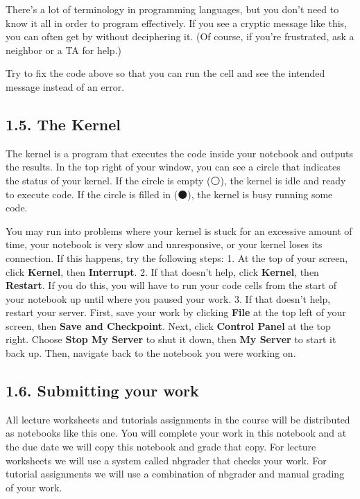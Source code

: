 \documentclass[11pt]{article}
\begin{document}
    There's a lot of terminology in programming languages, but you don't
need to know it all in order to program effectively. If you see a
cryptic message like this, you can often get by without deciphering it.
(Of course, if you're frustrated, ask a neighbor or a TA for help.)

Try to fix the code above so that you can run the cell and see the
intended message instead of an error.

    \subsection{1.5. The Kernel}\label{the-kernel}

The kernel is a program that executes the code inside your notebook and
outputs the results. In the top right of your window, you can see a
circle that indicates the status of your kernel. If the circle is empty
(⚪), the kernel is idle and ready to execute code. If the circle is
filled in (⚫), the kernel is busy running some code.

You may run into problems where your kernel is stuck for an excessive
amount of time, your notebook is very slow and unresponsive, or your
kernel loses its connection. If this happens, try the following steps:
1. At the top of your screen, click \textbf{Kernel}, then
\textbf{Interrupt}. 2. If that doesn't help, click \textbf{Kernel}, then
\textbf{Restart}. If you do this, you will have to run your code cells
from the start of your notebook up until where you paused your work. 3.
If that doesn't help, restart your server. First, save your work by
clicking \textbf{File} at the top left of your screen, then \textbf{Save
and Checkpoint}. Next, click \textbf{Control Panel} at the top right.
Choose \textbf{Stop My Server} to shut it down, then \textbf{My Server}
to start it back up. Then, navigate back to the notebook you were
working on.

    \subsection{1.6. Submitting your work}\label{submitting-your-work}

All lecture worksheets and tutorials assignments in the course will be
distributed as notebooks like this one. You will complete your work in
this notebook and at the due date we will copy this notebook and grade
that copy. For lecture worksheets we will use a system called nbgrader
that checks your work. For tutorial assignments we will use a
combination of nbgrader and manual grading of your work.
\end{document}
